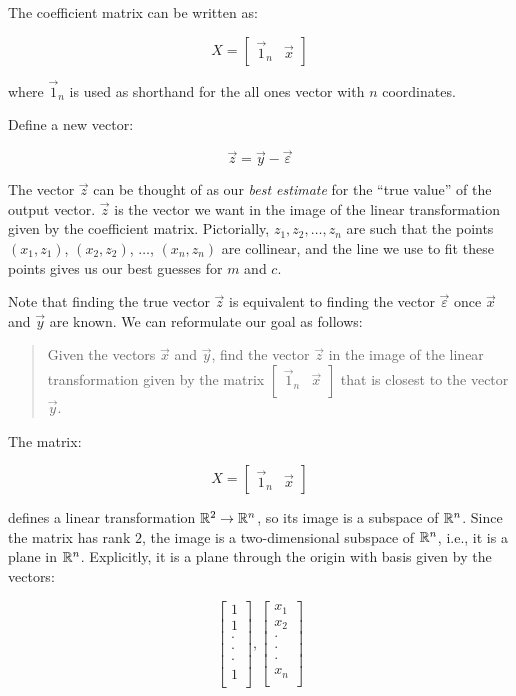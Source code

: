 \documentclass[10pt]{amsart}
\begin{document}
The coefficient matrix can be written as:

$$X = \left[\begin{matrix} \vec{1}_n & \vec{x}\end{matrix}\right]$$

where $\vec{1}_n$ is used as shorthand for the all ones vector with $n$
coordinates.

Define a new vector:

$$\vec{z} = \vec{y} - \vec{\varepsilon}$$

The vector $\vec{z}$ can be thought of as our {\em best estimate} for
the ``true value'' of the output vector. $\vec{z}$ is the vector we
want in the image of the linear transformation given by the
coefficient matrix. Pictorially, $z_1,z_2,\dots,z_n$ are such that the
points $(x_1,z_1)$, $(x_2,z_2)$, $\dots$, $(x_n,z_n)$ are collinear,
and the line we use to fit these points gives us our best guesses for
$m$ and $c$.

Note that finding the true vector $\vec{z}$ is equivalent to finding
the vector $\vec{\varepsilon}$ once $\vec{x}$ and $\vec{y}$ are known. We can
reformulate our goal as follows:

\begin{quote}
  Given the vectors $\vec{x}$ and $\vec{y}$, find the vector $\vec{z}$
  in the image of the linear transformation given by the matrix
  $\left[\begin{matrix} \vec{1}_n & \vec{x} \\\end{matrix}\right]$ that
  is closest to the vector $\vec{y}$.
\end{quote}

The matrix:

$$X = \left[\begin{matrix} \vec{1}_n & \vec{x} \end{matrix}\right]$$

defines a linear transformation $\mathbb{R}^2 \to \mathbb{R}^n$, so its image is a
subspace of $\mathbb{R}^n$. Since the matrix has rank $2$, the image is a
two-dimensional subspace of $\mathbb{R}^n$, i.e., it is a plane in
$\mathbb{R}^n$. Explicitly, it is a plane through the origin with basis given
by the vectors:

$$\left[\begin{matrix} 1 \\ 1 \\ \cdot \\ \cdot \\ \cdot \\ 1 \\\end{matrix}\right], \left[\begin{matrix} x_1 \\ x_2 \\ \cdot \\ \cdot \\ \cdot \\ x_n \\\end{matrix}\right]$$
\end{document}
